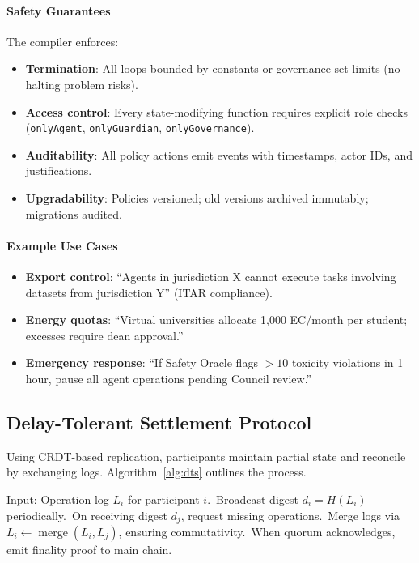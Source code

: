 \documentclass[11pt]{article}
\begin{document}
\paragraph{Safety Guarantees} The compiler enforces:
\begin{itemize}[noitemsep]
  \item \textbf{Termination}: All loops bounded by constants or governance-set limits (no halting problem risks).
  \item \textbf{Access control}: Every state-modifying function requires explicit role checks (\texttt{onlyAgent}, \texttt{onlyGuardian}, \texttt{onlyGovernance}).
  \item \textbf{Auditability}: All policy actions emit events with timestamps, actor IDs, and justifications.
  \item \textbf{Upgradability}: Policies versioned; old versions archived immutably; migrations audited.
\end{itemize}

\paragraph{Example Use Cases}
\begin{itemize}[noitemsep]
  \item \textbf{Export control}: ``Agents in jurisdiction X cannot execute tasks involving datasets from jurisdiction Y'' (ITAR compliance).
  \item \textbf{Energy quotas}: ``Virtual universities allocate 1,000 EC/month per student; excesses require dean approval.''
  \item \textbf{Emergency response}: ``If Safety Oracle flags $>10$ toxicity violations in 1 hour, pause all agent operations pending Council review.''
\end{itemize}

\subsection{Delay-Tolerant Settlement Protocol}
Using CRDT-based replication, participants maintain partial state and reconcile by exchanging logs. Algorithm~\ref{alg:dts} outlines the process.

\begin{algorithm}[H]
  \caption{Delay-Tolerant Settlement (DTS)}
  \label{alg:dts}
  \begin{algorithmic}[1]
    \STATE Input: Operation log $L_i$ for participant $i$.\
    \STATE Broadcast digest $d_i = H(L_i)$ periodically.\
    \STATE On receiving digest $d_j$, request missing operations.\
    \STATE Merge logs via $L_i \leftarrow \operatorname{merge}(L_i, L_j)$, ensuring commutativity.\
    \STATE When quorum acknowledges, emit finality proof to main chain.\
  \end{algorithmic}
\end{algorithm}
\end{document}
